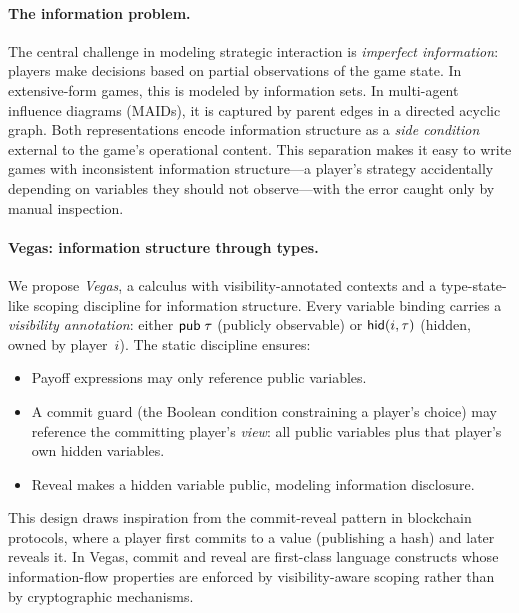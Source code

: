 \documentclass[11pt]{article}
\begin{document}
\paragraph{The information problem.}
The central challenge in modeling strategic interaction is \emph{imperfect
information}: players make decisions based on partial observations of the
game state. In extensive-form games, this is modeled by information sets. In
multi-agent influence diagrams (MAIDs), it is captured by parent edges in a
directed acyclic graph. Both representations encode information structure as a
\emph{side condition} external to the game's operational content. This
separation makes it easy to write games with inconsistent information
structure---a player's strategy accidentally depending on variables they should
not observe---with the error caught only by manual inspection.

\paragraph{Vegas: information structure through types.}
We propose \emph{Vegas}, a calculus with visibility-annotated contexts and a
type-state-like scoping discipline for information structure. Every variable binding carries a
\emph{visibility annotation}: either $\mathsf{pub}\;\tau$ (publicly observable) or
$\mathsf{hid}(i, \tau)$ (hidden, owned by player~$i$). The static discipline ensures:
%
\begin{itemize}[nosep]
\item Payoff expressions may only reference public variables.
\item A commit guard (the Boolean condition constraining a player's choice)
      may reference the committing player's \emph{view}: all public variables
      plus that player's own hidden variables.
\item Reveal makes a hidden variable public, modeling information disclosure.
\end{itemize}
%
This design draws inspiration from the commit-reveal pattern in blockchain
protocols, where a player first commits to a value (publishing a hash) and
later reveals it. In Vegas, commit and reveal are first-class language
constructs whose information-flow properties are enforced by visibility-aware
scoping rather than by cryptographic mechanisms.
\end{document}
